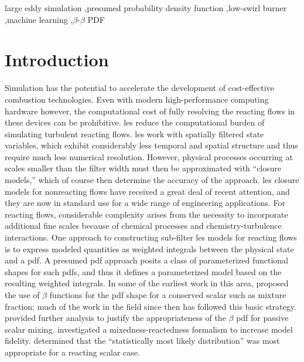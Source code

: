 \documentclass[review]{elsarticle}
\begin{document}
\begin{frontmatter}
\begin{keyword}
  large eddy simulation \sep presumed probability density function \sep low-swirl burner \sep machine learning \sep $\beta$-$\beta$ PDF
\end{keyword}

\end{frontmatter}

\glsresetall


\section{Introduction}
Simulation has the potential to accelerate the development of
cost-effective combustion technologies. Even with modern
high-performance computing hardware however, the computational cost of
fully resolving the reacting flows in these devices can be
prohibitive. \Gls{les} reduce the computational burden of simulating
turbulent reacting flows. \Gls{les} work with spatially filtered state
variables, which exhibit considerably less temporal and spatial
structure and thus require much less numerical resolution. However,
physical processes occurring at scales smaller than the filter width
must then be approximated with ``closure models,'' which of course
then determine the accuracy of the approach. \Gls{les} closure models
for nonreacting flows have received a great deal of recent attention,
and they are now in standard use for a wide range of engineering
applications. For reacting flows, considerable complexity arises from
the necessity to incorporate additional fine scales because of
chemical processes and chemistry-turbulence interactions. One approach
to constructing sub-filter \gls{les} models for reacting flows is to
express modeled quantities as weighted integrals between the physical
state and a \gls{pdf}. A presumed \gls{pdf} approach posits a class of
parameterized functional shapes for such \glspl{pdf}, and thus it
defines a parameterized model based on the resulting weighted
integrals. In some of the earliest work in this area, \citet{Cook1994}
proposed the use of $\beta$ functions for the \gls{pdf} shape for a
conserved scalar such as mixture fraction; much of the work in the
field since then has followed this basic strategy. \citet{Jimenez1997}
provided further analysis to justify the appropriateness of the
$\beta$ \gls{pdf} for passive scalar mixing. \citet{Bradley1998,
  Bradley2002} investigated a mixedness-reactedness formalism to
increase model fidelity. \citet{Ihme2008, Ihme2008a} determined that
the ``statistically most likely distribution'' was most appropriate
for a reacting scalar case.
\end{document}
